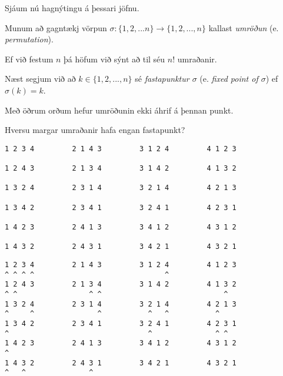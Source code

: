 {
	{
		\item<1-> Sjáum nú hagnýtingu á þessari jöfnu.
		\item<2-> Munum að gagntækj vörpun $\sigma \colon \{1, 2, ... n\} \rightarrow \{1, 2, ..., n\}$ kallast \emph{umröðun} (e. \emph{permutation}).
		\item<3-> Ef við festum $n$ þá höfum við sýnt að til séu $n!$ umraðanir.
		\item<4-> Næst segjum við að $k \in \{1, 2, ..., n\}$ sé \emph{fastapunktur $\sigma$} (e. \emph{fixed point of $\sigma$}) ef $\sigma(k) = k$.
		\item<5-> Með öðrum orðum hefur umröðunin ekki áhrif á þennan punkt.
		\item<6-> Hversu margar umraðanir hafa engan fastapunkt?
	}
}

{ \begin{verbatim}
1 2 3 4         2 1 4 3         3 1 2 4         4 1 2 3

1 2 4 3         2 1 3 4         3 1 4 2         4 1 3 2

1 3 2 4         2 3 1 4         3 2 1 4         4 2 1 3

1 3 4 2         2 3 4 1         3 2 4 1         4 2 3 1

1 4 2 3         2 4 1 3         3 4 1 2         4 3 1 2

1 4 3 2         2 4 3 1         3 4 2 1         4 3 2 1

\end{verbatim}}
{ \begin{verbatim}
1 2 3 4         2 1 4 3         3 1 2 4         4 1 2 3
^ ^ ^ ^                               ^                
1 2 4 3         2 1 3 4         3 1 4 2         4 1 3 2
^ ^                 ^ ^                             ^  
1 3 2 4         2 3 1 4         3 2 1 4         4 2 1 3
^     ^               ^           ^   ^           ^    
1 3 4 2         2 3 4 1         3 2 4 1         4 2 3 1
^                                 ^               ^ ^  
1 4 2 3         2 4 1 3         3 4 1 2         4 3 1 2
^                                                      
1 4 3 2         2 4 3 1         3 4 2 1         4 3 2 1
^   ^               ^                                  
\end{verbatim}}
